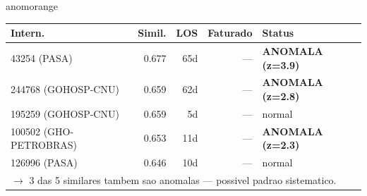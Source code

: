 \documentclass[a4paper,10pt]{article}
\begin{document}
\begin{anomalycard}[Internacao 103248 | GHO-BRADESCO | ALTO (z=4.02)]{anomorange}
\begin{tabular}{l r r r l}\toprule\textbf{Intern.} & \textbf{Simil.} & \textbf{LOS} & \textbf{Faturado} & \textbf{Status} \\\midrule
43254 (PASA) & 0.677 & 65d & --- & \textcolor{anomred}{\textbf{ANOMALA (z=3.9)}} \\
244768 (GOHOSP-CNU) & 0.659 & 62d & --- & \textcolor{anomred}{\textbf{ANOMALA (z=2.8)}} \\
195259 (GOHOSP-CNU) & 0.659 & 5d & --- & \textcolor{jcubeblue}{normal} \\
100502 (GHO-PETROBRAS) & 0.653 & 11d & --- & \textcolor{anomred}{\textbf{ANOMALA (z=2.3)}} \\
126996 (PASA) & 0.646 & 10d & --- & \textcolor{jcubeblue}{normal} \\
\multicolumn{5}{l}{\textcolor{anomred}{\small $\rightarrow$ 3 das 5 similares tambem sao anomalas --- possivel padrao sistematico.}} \\
\bottomrule\end{tabular}



\end{anomalycard}

\newpage
\end{document}

